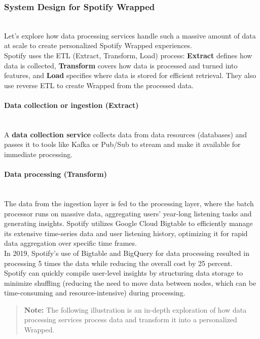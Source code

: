 \subsubsection{System Design for Spotify Wrapped}\label{zerAuJJCHV5AdzE0PaHWT}
\\
Let's explore how data processing services handle such a massive amount of data at scale to create personalized Spotify Wrapped experiences.
\\
Spotify uses the ETL (Extract, Transform, Load) process: \textbf{Extract} defines how data is collected, \textbf{Transform} covers how data is processed and turned into features, and \textbf{Load} specifies where data is stored for efficient retrieval. They also use reverse ETL to create Wrapped from the processed data.
\\
\paragraph{Data collection or ingestion (Extract)}\label{HdsWf6Trk2zeJM49OTnwD}
\\
A \textbf{data collection service} collects data from data resources (databases) and passes it to tools like Kafka or Pub/Sub to stream and make it available for immediate processing.
\\
\paragraph{Data processing (Transform)}\label{tdCYFGtrU3jm2IcPwnDtr}
\\
The data from the ingestion layer is fed to the processing layer, where the batch processor runs on massive data, aggregating users' year-long listening tasks and generating insights. Spotify utilizes Google Cloud Bigtable to efficiently manage its extensive time-series data and user listening history, optimizing it for rapid data aggregation over specific time frames.~
\\
In 2019, Spotify's use of Bigtable and BigQuery for data processing resulted in processing 5 times the data while reducing the overall cost by 25 percent.
\\
Spotify can quickly compile user-level insights by structuring data storage to minimize shuffling (reducing the need to move data between nodes, which can be time-consuming and resource-intensive) during processing.
\begin{quote}
\textbf{Note:} The following illustration is an in-depth exploration of how data processing services process data and transform it into a personalized Wrapped.
\end{quote}


